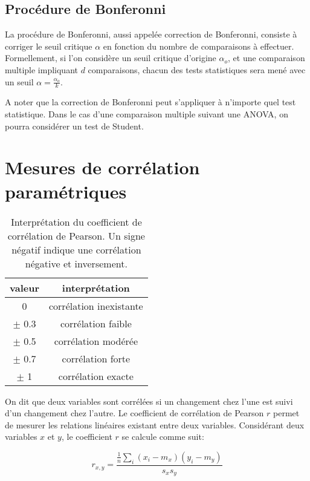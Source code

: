 \subsection*{Procédure de Bonferonni}
\label{app:bonferonni}

La procédure de Bonferonni, aussi appelée correction de Bonferonni, consiste à corriger le seuil critique $\alpha$ en fonction du nombre de comparaisons à effectuer. Formellement, si l'on considère un seuil critique d'origine $\alpha_{o}$, et une comparaison multiple impliquant $d$ comparaisons, chacun des tests statistiques sera mené avec un seuil $\alpha=\frac{\alpha_{o}}{k}$. 

A noter que la correction de Bonferonni peut s'appliquer à n'importe quel test statistique. Dans le cas d'une comparaison multiple suivant une ANOVA, on pourra considérer un test de Student.

\section{Mesures de corrélation paramétriques}
\label{app:corr}

\begin{table}[t]
\centering
\begin{tabular}{c c }  
valeur & interprétation  \\      
\hline
      0   & corrélation inexistante \\
$\pm$ 0.3 & corrélation faible \\
$\pm$ 0.5 & corrélation modérée \\
$\pm$ 0.7 & corrélation forte \\
$\pm$ 1   & corrélation exacte \\
\hline
\end{tabular}
\vspace{0.5mm}
\caption[Interprétation du coefficient de corrélation de Pearson.]{Interprétation du coefficient de corrélation de Pearson. Un signe négatif indique une corrélation négative et inversement.}
\label{tab:coefPearson}
\end{table}

On dit que deux variables sont corrélées si un changement chez l'une est suivi d'un changement chez l'autre. Le coefficient de corrélation de Pearson $r$ permet de mesurer les relations linéaires existant entre deux variables. Considérant deux variables $x$ et $y$, le coefficient $r$ se calcule comme suit:

\begin{equation}
r_{x,y}=\dfrac{\frac{1}{n}\sum\limits_i(x_i - m_x)(y_i-m_y)}{s_x s_y}
\end{equation}

